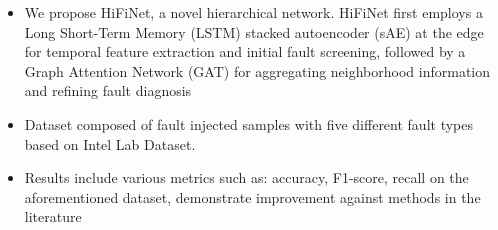 \begin{itemize} 
  \item We propose HiFiNet, a novel hierarchical network. HiFiNet first employs a Long Short-Term Memory (LSTM) stacked autoencoder (sAE) at the edge for temporal feature extraction and initial fault screening, followed by a Graph Attention Network (GAT) for aggregating neighborhood information and refining fault diagnosis
  \item Dataset composed of fault injected samples with five different fault types based on Intel Lab Dataset. 
  \item Results include various metrics such as: accuracy, F1-score, recall on the aforementioned dataset, demonstrate improvement against methods in the literature 
\end{itemize}
